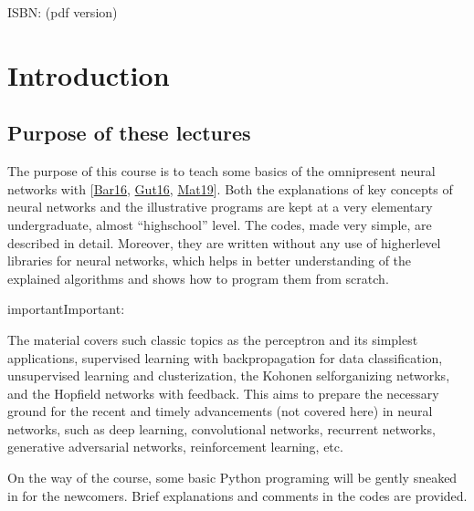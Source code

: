 \documentclass[letterpaper,10pt,english]{jupyterBook}
\begin{document}
\sphinxAtStartPar
ISBN:  (pdf version) 


\chapter{Introduction}
\label{\detokenize{docs/intro:introduction}}\label{\detokenize{docs/intro::doc}}

\section{Purpose of these lectures}
\label{\detokenize{docs/intro:purpose-of-these-lectures}}
\sphinxAtStartPar
The purpose of this course is to teach some basics of the omnipresent neural networks with  {[}\hyperlink{cite.docs/conclusion:id5}{Bar16}, \hyperlink{cite.docs/conclusion:id3}{Gut16}, \hyperlink{cite.docs/conclusion:id2}{Mat19}{]}. Both the explanations of key concepts of neural networks and the illustrative programs are kept at a very elementary undergraduate, almost “high\sphinxhyphen{}school” level. The codes, made very simple, are described in detail. Moreover, they are written without any use of higher\sphinxhyphen{}level libraries for neural networks, which helps in better understanding of the explained algorithms and shows how to program them from scratch.

\begin{sphinxadmonition}{important}{Important:}
\sphinxAtStartPar
{}
\end{sphinxadmonition}

\sphinxAtStartPar
The material covers such classic topics as the perceptron and its simplest applications, supervised learning with back\sphinxhyphen{}propagation for data classification, unsupervised learning and clusterization, the Kohonen self\sphinxhyphen{}organizing networks, and the Hopfield networks with feedback. This aims to prepare the necessary ground for the recent and timely advancements (not covered here) in neural networks, such as deep learning, convolutional networks, recurrent networks, generative adversarial networks, reinforcement learning, etc.

\sphinxAtStartPar
On the way of the course, some basic Python programing will be gently sneaked in for the newcomers. Brief explanations and comments in the codes are provided.
\end{document}
